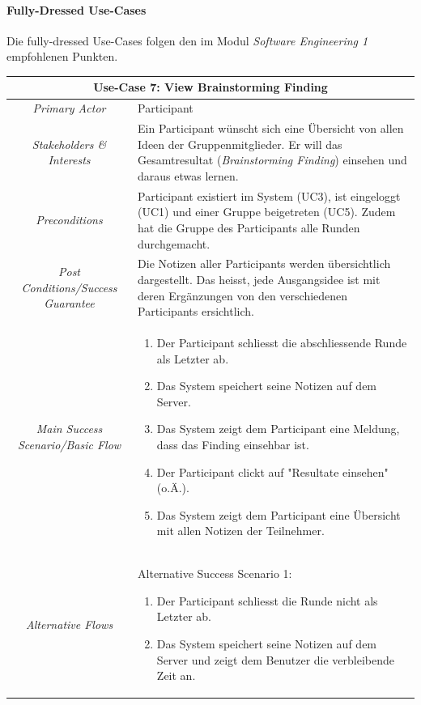 \paragraph{Fully-Dressed Use-Cases}
\label{par:fully_dressed_use_cases}
Die fully-dressed Use-Cases folgen den im Modul \textit{Software Engineering 1} empfohlenen Punkten.
\renewcommand{\arraystretch}{1.35}
\begin{center}
	\begin{longtable}{| c | p{7cm} |}
		\hline
		\multicolumn{2}{|c|}{\textbf{Use-Case 7: View Brainstorming Finding}}\\
		\hline\hline
		\textit{Primary Actor} & Participant\\
		\hline
		\textit{Stakeholders \& Interests} & Ein Participant wünscht sich eine Übersicht von allen Ideen der Gruppenmitglieder. Er will das Gesamtresultat (\textit{Brainstorming Finding}) einsehen und daraus etwas lernen. \\
		\hline
		\textit{Preconditions} & Participant existiert im System (UC3), ist eingeloggt (UC1) und einer Gruppe beigetreten (UC5). Zudem hat die Gruppe des Participants alle Runden durchgemacht.\\
		\hline
		\textit{Post Conditions/Success Guarantee} & Die Notizen aller Participants werden übersichtlich dargestellt. Das heisst, jede Ausgangsidee ist mit deren Ergänzungen von den verschiedenen Participants ersichtlich.\\
		\hline
		\textit{Main Success Scenario/Basic Flow} & 
		\begin{enumerate}[noitemsep]
			\item Der Participant schliesst die abschliessende Runde als Letzter ab.
			\item Das System speichert seine Notizen auf dem Server.
			\item Das System zeigt dem Participant eine Meldung, dass das Finding einsehbar ist.
			\item Der Participant clickt auf "Resultate einsehen" (o.Ä.).
			\item Das System zeigt dem Participant eine Übersicht mit allen Notizen der Teilnehmer.
		\end{enumerate}\\
		\hline
		\textit{Alternative Flows} &
		Alternative	Success Scenario 1:
		\begin{enumerate}[label=1.\alph*,noitemsep]
			\item Der Participant schliesst die Runde nicht als Letzter ab.
			\item Das System speichert seine Notizen auf dem Server und zeigt dem Benutzer die verbleibende Zeit an.

\end{enumerate}
\end{longtable}
\end{center}
